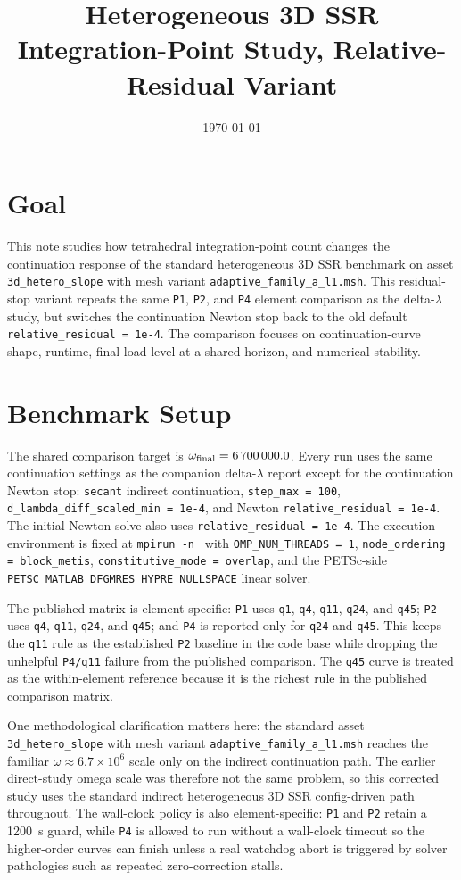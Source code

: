 \documentclass[11pt,a4paper]{article}
\title{Heterogeneous 3D SSR Integration-Point Study, Relative-Residual Variant}
\author{}
\date{\today}
\begin{document}
\maketitle

\section{Goal}
This note studies how tetrahedral integration-point count changes the continuation response of the standard heterogeneous 3D SSR benchmark on asset \texttt{3d\_hetero\_slope} with mesh variant \texttt{adaptive\_family\_a\_l1.msh}. This residual-stop variant repeats the same \texttt{P1}, \texttt{P2}, and \texttt{P4} element comparison as the delta-\(\lambda\) study, but switches the continuation Newton stop back to the old default \texttt{relative\_residual = 1e-4}. The comparison focuses on continuation-curve shape, runtime, final load level at a shared horizon, and numerical stability.

\section{Benchmark Setup}
The shared comparison target is $\omega_{\mathrm{final}} = \num{6700000.0}$. Every run uses the same continuation settings as the companion delta-\(\lambda\) report except for the continuation Newton stop: \texttt{secant} indirect continuation, \texttt{step\_max = 100}, \texttt{d\_lambda\_diff\_scaled\_min = 1e-4}, and Newton \texttt{relative\_residual = 1e-4}. The initial Newton solve also uses \texttt{relative\_residual = 1e-4}. The execution environment is fixed at \texttt{mpirun -n \StudyMpiRanks} with \texttt{OMP\_NUM\_THREADS = 1}, \texttt{node\_ordering = block\_metis}, \texttt{constitutive\_mode = overlap}, and the PETSc-side \texttt{PETSC\_MATLAB\_DFGMRES\_HYPRE\_NULLSPACE} linear solver.

The published matrix is element-specific: \texttt{P1} uses \texttt{q1}, \texttt{q4}, \texttt{q11}, \texttt{q24}, and \texttt{q45}; \texttt{P2} uses \texttt{q4}, \texttt{q11}, \texttt{q24}, and \texttt{q45}; and \texttt{P4} is reported only for \texttt{q24} and \texttt{q45}. This keeps the \texttt{q11} rule as the established \texttt{P2} baseline in the code base while dropping the unhelpful \texttt{P4/q11} failure from the published comparison. The \texttt{q45} curve is treated as the within-element reference because it is the richest rule in the published comparison matrix.

One methodological clarification matters here: the standard asset \texttt{3d\_hetero\_slope} with mesh variant \texttt{adaptive\_family\_a\_l1.msh} reaches the familiar $\omega \approx 6.7\times 10^6$ scale only on the indirect continuation path. The earlier direct-study omega scale was therefore not the same problem, so this corrected study uses the standard indirect heterogeneous 3D SSR config-driven path throughout.
The wall-clock policy is also element-specific: \texttt{P1} and \texttt{P2} retain a \SI{1200}{s} guard, while \texttt{P4} is allowed to run without a wall-clock timeout so the higher-order curves can finish unless a real watchdog abort is triggered by solver pathologies such as repeated zero-correction stalls.
\end{document}
